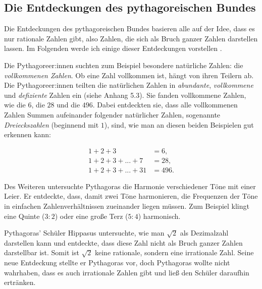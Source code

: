 \documentclass[a4paper,12pt]{article}
\begin{document}
\subsection{Die Entdeckungen des pythagoreischen Bundes}

Die Entdeckungen des pythagoreischen Bundes basieren alle auf der Idee, dass es nur rationale Zahlen gibt, also Zahlen, die sich als Bruch ganzer Zahlen darstellen lassen. Im Folgenden werde ich einige dieser Entdeckungen vorstellen \cite[S. 37-41]{Buch}.

Die Pythagoreer:innen suchten zum Beispiel besondere natürliche Zahlen: die \emph{vollkommenen Zahlen}. Ob eine Zahl vollkommen ist, hängt von ihren Teilern ab. Die Pythagoreer:innen teilten die natürlichen Zahlen in \emph{abundante}, \emph{vollkommene} und \emph{defiziente} Zahlen ein (siehe Anhang 5.3). Sie fanden vollkommene Zahlen, wie die $6$, die $28$ und die $496$. Dabei entdeckten sie, dass alle vollkommenen Zahlen Summen aufeinander folgender natürlicher Zahlen, sogenannte \emph{Dreieckszahlen} (beginnend mit $1$), sind, wie man an diesen beiden Beispielen gut erkennen kann:

\begin{align*}
1 + 2 + 3 &= 6,\\
1 + 2 + 3 + ... + 7 &= 28,\\
1 + 2 + 3 + ... + 31 &= 496.
\end{align*}

Des Weiteren untersuchte Pythagoras die Harmonie verschiedener Töne mit einer Leier. Er entdeckte, dass, damit zwei Töne harmonieren, die Frequenzen der Töne in einfachen Zahlenverhältnissen zueinander liegen müssen. Zum Beispiel klingt eine Quinte ($3:2$) oder eine große Terz ($5:4$) harmonisch.

Pythagoras' Schüler Hippasus untersuchte, wie man $\sqrt{2}$ als Dezimalzahl darstellen kann und entdeckte, dass diese Zahl nicht als Bruch ganzer Zahlen darstellbar ist. Somit ist $\sqrt{2}$ keine rationale, sondern eine irrationale Zahl. Seine neue Entdeckung stellte er Pythagoras vor, doch Pythagoras wollte nicht wahrhaben, dass es auch irrationale Zahlen gibt und ließ den Schüler daraufhin ertränken.
\end{document}
